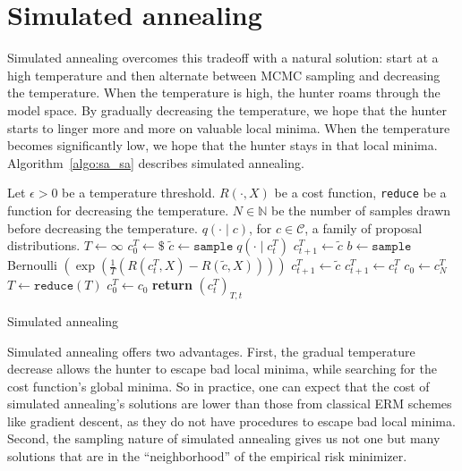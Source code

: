 \section{Simulated annealing}
\label{sec:simulated_annealing}

Simulated annealing overcomes this tradeoff with a natural solution: start
at a high temperature and then alternate between MCMC sampling and
decreasing the temperature. When the temperature is high, the hunter
roams through the model space. By gradually decreasing the temperature,
we hope that the hunter starts to linger more and more on valuable local
minima. When the temperature becomes significantly low, we hope that
the hunter stays in that local minima. Algorithm~\ref{algo:sa_sa} describes simulated
annealing.

\begin{algorithm}
\begin{algorithmic}[1]
\State Let
\State \quad $\epsilon > 0$ be a temperature threshold.
\State \quad $R(\cdot, X)$ be a cost function,
\State \quad \texttt{reduce} be a function for decreasing the temperature.
\State \quad $N \in \mathbb{N}$ be the number of samples drawn before decreasing the temperature.
\State \quad $q(\cdot \mid c)$, for $c \in \mathcal{C}$, a family of proposal distributions.
\State
{}
\State $T \gets \infty$ 
\State $c^T_0 \gets \$$ 
\State $\tilde{c} \gets \texttt{sample} \; q(\cdot \mid c^T_t)$
\State $c^T_{t+1} \gets \tilde{c}$
\Else
\State $b \gets \texttt{sample}$ Bernoulli $\left(\exp\left(\frac{1}{T}\left(R(c^T_t, X)-R(\tilde{c}, X)\right)\right)\right)$
\State $c^T_{t+1} \gets \tilde{c}$
\Else
\State $c^T_{t+1} \gets c^T_t$
\EndIf
\EndIf
\EndFor
\State $c_0 \gets c^T_N$ 
\State $T \gets \texttt{reduce}(T)$
\State $c^T_0 \gets c_0$
\EndWhile
\State \textbf{return} $\left(c^T_t\right)_{T, t}$
\EndFunction
\end{algorithmic}
\caption{Simulated annealing}
\label{algo:sa_sa}
\end{algorithm}

Simulated annealing offers two advantages. First, the gradual temperature
decrease allows the hunter to escape bad local minima, while searching
for the cost function's global minima. So in practice, one can expect that
the cost of simulated annealing's solutions are lower than those from classical
ERM schemes like gradient descent, as they do not have procedures
to escape bad local minima. Second, the sampling nature of simulated annealing
gives us not one but many solutions that are in the ``neighborhood''
of the empirical risk minimizer.

